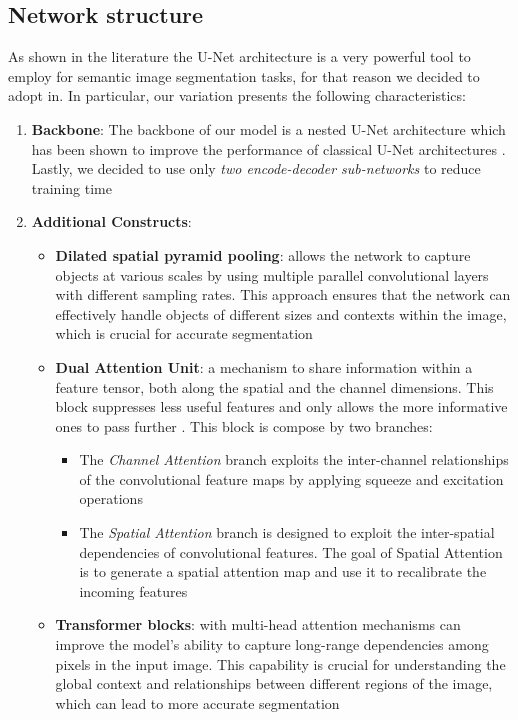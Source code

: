 \documentclass[11pt]{article}
\begin{document}
\begin{multicols}{2}
        \subsection{Network structure}
        As shown in the literature \cite{unet} the U-Net architecture is a very powerful tool to employ for semantic image segmentation tasks, for that reason we decided to adopt in. In particular, our variation presents the following characteristics: 
        \begin{enumerate}
            \item \textbf{Backbone}:
            The backbone of our model is a nested U-Net architecture which has been shown to improve the performance of classical U-Net architectures \cite{unet++}. Lastly, we decided to use only \textit{two encode-decoder sub-networks} to reduce training time
            \item \textbf{Additional Constructs}:
              \begin{itemize}
                  \item \textbf{Dilated spatial pyramid pooling}: allows the network to capture objects at various scales by using multiple parallel convolutional layers with different sampling rates. This approach ensures that the network can effectively handle objects of different sizes and contexts within the image, which is crucial for accurate segmentation \cite{dspp1}\cite{dspp2}\cite{dspp3}
                  \item \textbf{Dual Attention Unit}: a mechanism to share information within a feature tensor, both along the spatial and the channel dimensions. This block suppresses less useful features and only allows the more informative ones to pass further \cite{dau1} \cite{dau2}. This block is compose by two branches:
                  \begin{itemize}
                      \item The \textit{Channel Attention} branch exploits the inter-channel relationships of the convolutional feature maps by applying squeeze and excitation operations
                      \item The \textit{Spatial Attention} branch is designed to exploit the inter-spatial dependencies of convolutional features. The goal of Spatial Attention is to generate a spatial attention map and use it to recalibrate the incoming features
                  \end{itemize}
                  \item \textbf{Transformer blocks}: with multi-head attention mechanisms can improve the model's ability to capture long-range dependencies among pixels in the input image. This capability is crucial for understanding the global context and relationships between different regions of the image, which can lead to more accurate segmentation
              \end{itemize}
              

\end{enumerate}
\end{multicols}
\end{document}
